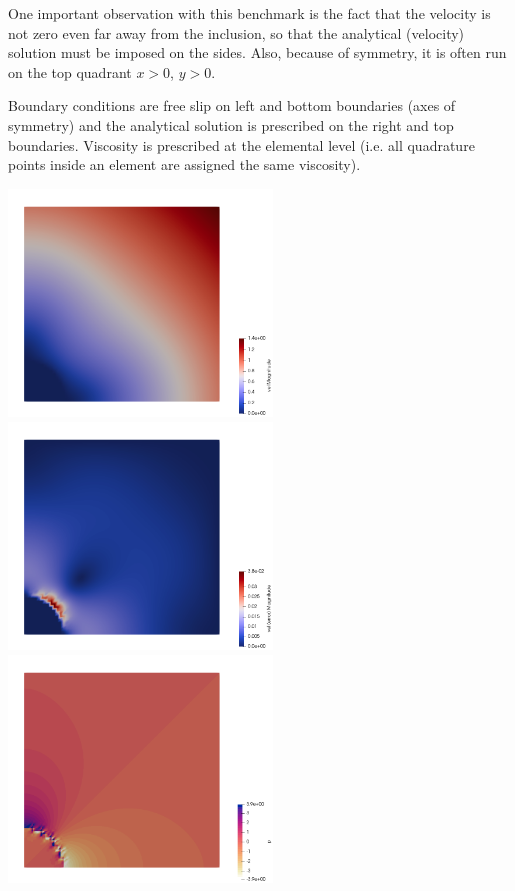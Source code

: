 One important observation with this benchmark is the fact that the 
velocity is not zero even far 
away from the inclusion, so that the analytical (velocity) solution must be imposed on the sides.
Also, because of symmetry, it is often run on the top quadrant $x>0$, $y>0$.

Boundary conditions are free slip on left and bottom boundaries (axes of symmetry)
and the analytical solution is prescribed on the right and top boundaries.
Viscosity is prescribed at the elemental level (i.e. all quadrature points inside an element
are assigned the same viscosity).

\begin{center}
\includegraphics[width=7cm]{python_codes/fieldstone_161/results/bench4/vel}
\includegraphics[width=7cm]{python_codes/fieldstone_161/results/bench4/vel_error}\\
\includegraphics[width=7cm]{python_codes/fieldstone_161/results/bench4/press}

\end{center}
